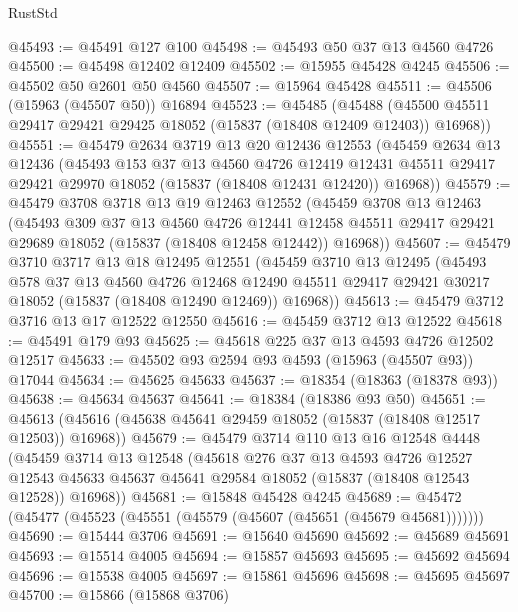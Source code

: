\begin{lexlean}{RustStd}
\begin{coremodule}
{\begin{coremodule}
{{{{{{{{{{{{{{{{{{{{{{{{{{{{{{{{{{{{{{{{{{{{{{{{{{{{{{{{{{{{@45493 := @45491 @127 @100
@45498 := @45493 @50 @37 @13 @4560 @4726
@45500 := @45498 @12402 @12409
@45502 := @15955 @45428 @4245
@45506 := @45502 @50 @2601 @50 @4560
@45507 := @15964 @45428
@45511 := @45506 (@15963 (@45507 @50)) @16894
@45523 := @45485
    (@45488 (@45500 @45511 @29417 @29421 @29425 @18052 (@15837 (@18408 @12409 @12403)) @16968))
@45551 := @45479
    @2634
    @3719
    @13
    @20
    @12436
    @12553
    (@45459
      @2634
      @13
      @12436
      (@45493
        @153
        @37
        @13
        @4560
        @4726
        @12419
        @12431
        @45511
        @29417
        @29421
        @29970
        @18052
        (@15837 (@18408 @12431 @12420))
        @16968))
@45579 := @45479
    @3708
    @3718
    @13
    @19
    @12463
    @12552
    (@45459
      @3708
      @13
      @12463
      (@45493
        @309
        @37
        @13
        @4560
        @4726
        @12441
        @12458
        @45511
        @29417
        @29421
        @29689
        @18052
        (@15837 (@18408 @12458 @12442))
        @16968))
@45607 := @45479
    @3710
    @3717
    @13
    @18
    @12495
    @12551
    (@45459
      @3710
      @13
      @12495
      (@45493
        @578
        @37
        @13
        @4560
        @4726
        @12468
        @12490
        @45511
        @29417
        @29421
        @30217
        @18052
        (@15837 (@18408 @12490 @12469))
        @16968))
@45613 := @45479 @3712 @3716 @13 @17 @12522 @12550
@45616 := @45459 @3712 @13 @12522
@45618 := @45491 @179 @93
@45625 := @45618 @225 @37 @13 @4593 @4726 @12502 @12517
@45633 := @45502 @93 @2594 @93 @4593 (@15963 (@45507 @93)) @17044
@45634 := @45625 @45633
@45637 := @18354 (@18363 (@18378 @93))
@45638 := @45634 @45637
@45641 := @18384 (@18386 @93 @50)
@45651 := @45613 (@45616 (@45638 @45641 @29459 @18052 (@15837 (@18408 @12517 @12503)) @16968))
@45679 := @45479
    @3714
    @110
    @13
    @16
    @12548
    @4448
    (@45459
      @3714
      @13
      @12548
      (@45618
        @276
        @37
        @13
        @4593
        @4726
        @12527
        @12543
        @45633
        @45637
        @45641
        @29584
        @18052
        (@15837 (@18408 @12543 @12528))
        @16968))
@45681 := @15848 @45428 @4245
@45689 := @45472 (@45477 (@45523 (@45551 (@45579 (@45607 (@45651 (@45679 @45681)))))))
@45690 := @15444 @3706
@45691 := @15640 @45690
@45692 := @45689 @45691
@45693 := @15514 @4005
@45694 := @15857 @45693
@45695 := @45692 @45694
@45696 := @15538 @4005
@45697 := @15861 @45696
@45698 := @45695 @45697
@45700 := @15866 (@15868 @3706)
}}}}}}}}}}}}}}}}}}}}}}}}}}}}}}}}}}}}}}}}}}}}}}}}}}}}}}}}}}}}
\end{coremodule}}
\end{coremodule}
\end{lexlean}
